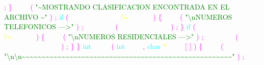 \textcolor{magenta}{;} 
\textcolor{magenta}{\}} 
\textcolor{white}{puts} 
\textcolor{magenta}{(} 
\textcolor{green}{"\textasciitilde  MOSTRANDO CLASIFICACION ENCONTRADA EN EL ARCHIVO \textasciitilde "} 
\textcolor{magenta}{)} 
\textcolor{magenta}{;} 
\textcolor{cyan}{if} 
\textcolor{magenta}{(} 
\textcolor{white}{numTelefonicos} 
\textcolor{yellow}{!=} 
\textcolor{white}{NULL} 
\textcolor{magenta}{)} 
\textcolor{magenta}{\{} 
\textcolor{white}{puts} 
\textcolor{magenta}{(} 
\textcolor{green}{"\textbackslash nNUMEROS TELEFONICOS --->"} 
\textcolor{magenta}{)} 
\textcolor{magenta}{;} 
\textcolor{white}{imprimir} 
\textcolor{magenta}{(} 
\textcolor{white}{numTelefonicos} 
\textcolor{magenta}{)} 
\textcolor{magenta}{;} 
\textcolor{magenta}{\}} 
\textcolor{cyan}{if} 
\textcolor{magenta}{(} 
\textcolor{white}{numResidenciales} 
\textcolor{yellow}{!=} 
\textcolor{white}{NULL} 
\textcolor{magenta}{)} 
\textcolor{magenta}{\{} 
\textcolor{white}{puts} 
\textcolor{magenta}{(} 
\textcolor{green}{"\textbackslash nNUMEROS RESIDENCIALES --->"} 
\textcolor{magenta}{)} 
\textcolor{magenta}{;} 
\textcolor{white}{imprimir} 
\textcolor{magenta}{(} 
\textcolor{white}{numResidenciales} 
\textcolor{magenta}{)} 
\textcolor{magenta}{;} 
\textcolor{magenta}{\}} 
\textcolor{magenta}{\}} 
\textcolor{cyan}{int} 
\textcolor{white}{main} 
\textcolor{magenta}{(} 
\textcolor{cyan}{int} 
\textcolor{white}{argc} 
\textcolor{magenta}{,} 
\textcolor{cyan}{char} 
\textcolor{yellow}{*} 
\textcolor{white}{argv} 
\textcolor{magenta}{[} 
\textcolor{magenta}{]} 
\textcolor{magenta}{)} 
\textcolor{magenta}{\{} 
\textcolor{white}{puts} 
\textcolor{magenta}{(} 
\textcolor{green}{"\textbackslash n\textbackslash n\textasciitilde \textasciitilde \textasciitilde \textasciitilde \textasciitilde \textasciitilde \textasciitilde \textasciitilde \textasciitilde \textasciitilde \textasciitilde \textasciitilde \textasciitilde \textasciitilde \textasciitilde \textasciitilde \textasciitilde \textasciitilde \textasciitilde \textasciitilde \textasciitilde \textasciitilde \textasciitilde \textasciitilde \textasciitilde \textasciitilde \textasciitilde \textasciitilde \textasciitilde \textasciitilde \textasciitilde \textasciitilde \textasciitilde \textasciitilde \textasciitilde \textasciitilde \textasciitilde \textasciitilde \textasciitilde \textasciitilde \textasciitilde \textasciitilde \textasciitilde \textasciitilde \textasciitilde \textasciitilde \textasciitilde \textasciitilde \textasciitilde \textasciitilde \textasciitilde \textasciitilde \textasciitilde "} 
\textcolor{magenta}{)} 
\textcolor{magenta}{;} 
\textcolor{white}{puts} 
